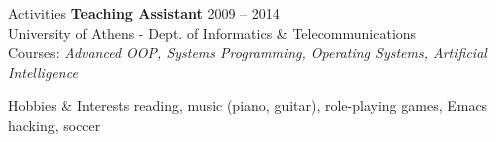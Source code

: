 \documentclass{resume}
\begin{document}


\begin{rSection}{Activities}
  {\bf Teaching Assistant} \hfill {2009 -- 2014} \\
  University of Athens - Dept. of Informatics \& Telecommunications \\
  Courses: \emph{Advanced OOP, Systems Programming, Operating Systems,
    Artificial Intelligence} \\
\end{rSection}


\begin{rSection}{Hobbies \& Interests}
  reading, music (piano, guitar), role-playing games, Emacs hacking, soccer \\
\end{rSection}



\end{document}
